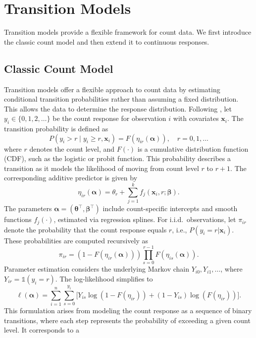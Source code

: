 \documentclass[english,a4paper,11pt]{article}
\begin{document}
\section{Transition Models} \label{sec:tm}

Transition models provide a flexible framework for count data. We first introduce the classic
count model and then extend it to continuous responses.

\subsection{Classic Count Model} \label{sec:counts}

Transition models offer a flexible approach to count data by estimating conditional
transition probabilities rather than assuming a fixed distribution. This allows the data to
determine the response distribution.
Following \cite{Berger:2021}, let $y_i \in \{0, 1, 2, \dots\}$ be the count response for
observation $i$ with covariates $\mathbf{x}_i$. The transition probability is defined as  
\begin{equation} \label{eqn:tm}
P(y_i > r \mid y_i \geq r, \mathbf{x}_i) = F(\eta_{ir}(\boldsymbol{\alpha})), \quad r = 0, 1, \dots
\end{equation}
where $r$ denotes the count level, and $F(\cdot)$ is a cumulative distribution function (CDF),
such as the logistic or probit function. This probability describes a transition as
it models the likelihood of moving from count level $r$ to $r + 1$. The corresponding additive
predictor is given by 
$$
\eta_{ir}(\boldsymbol{\alpha}) = \theta_r + \sum_{j=1}^k f_j(\mathbf{x}_i, r; \boldsymbol{\beta}).
$$
The parameters $\boldsymbol{\alpha} = (\boldsymbol{\theta}^\top, \boldsymbol{\beta}^\top)$
include count-specific intercepts and smooth functions $f_j(\cdot)$, estimated via regression splines.
For i.i.d.\ observations, let $\pi_{ir}$ denote the probability that the count response equals $r$,
i.e., $P(y_i = r | \mathbf{x}_i)$. These probabilities are computed recursively as
$$
\pi_{ir} = (1 - F(\eta_{ir}(\boldsymbol{\alpha}))) \prod_{s=0}^{r-1} F(\eta_{is}(\boldsymbol{\alpha})).
$$
Parameter estimation considers the underlying Markov chain $Y_{i0}, Y_{i1}, \dots$,
where $Y_{ir} = \mathbb{1}(y_i = r)$. The log-likelihood simplifies to  
$$
\ell(\boldsymbol{\alpha}) = \sum_{i=1}^n \sum_{s=0}^{y_i} \Big[Y_{is} \log(1 - F(\eta_{ir})) + (1 - Y_{is}) \log(F(\eta_{ir}))\Big].
$$
This formulation arises from modeling the count response as a sequence of binary transitions,
where each step represents the probability of exceeding a given count level. It corresponds to a
\end{document}
